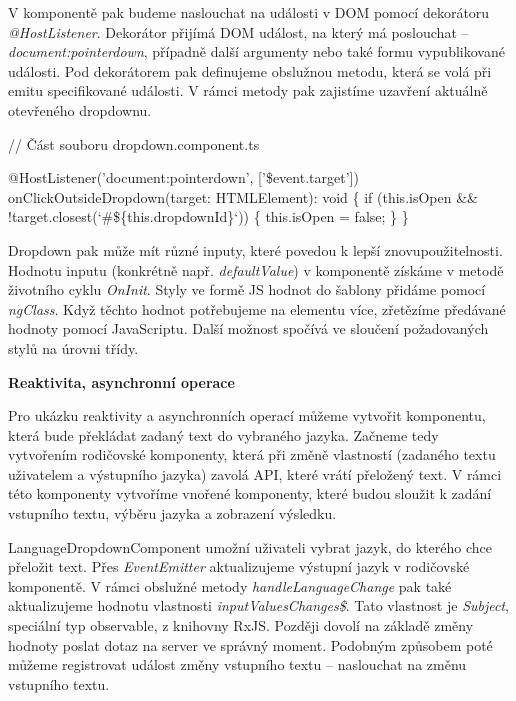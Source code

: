 V komponentě pak budeme naslouchat na události v DOM pomocí dekorátoru \emph{@HostListener}. 
Dekorátor přijímá DOM událost, na který má poslouchat -- \emph{document:pointerdown}, případně další argumenty nebo také formu vypublikované události. 
Pod dekorátorem pak definujeme obslužnou metodu, která se volá při emitu specifikované události. V rámci metody pak zajistíme uzavření aktuálně otevřeného dropdownu.

\begin{prog}
// Část souboru dropdown.component.ts

@HostListener('document:pointerdown', ['\$event.target'])
onClickOutsideDropdown(target: HTMLElement): void \{
  if (this.isOpen && !target.closest(`#\$\{this.dropdownId\}`)) \{
    this.isOpen = false;
  \}
\}
\end{prog}

Dropdown pak může mít různé inputy, které povedou k lepší znovupoužitelnosti. Hodnotu inputu (konkrétně např. \emph{defaultValue}) v komponentě získáme v metodě životního cyklu \emph{OnInit}. 
Styly ve formě JS hodnot do šablony přidáme pomocí \emph{ngClass}. Když těchto hodnot potřebujeme na elementu více, zřetězíme předávané hodnoty pomocí JavaScriptu. 
Další možnost spočívá ve sloučení požadovaných stylů na úrovni třídy.

\begin{flushleft}
  \textbf{Reaktivita, asynchronní operace}
\end{flushleft}

Pro ukázku reaktivity a asynchronních operací můžeme vytvořit komponentu, která bude překládat zadaný text do vybraného jazyka. 
Začneme tedy vytvořením rodičovské komponenty, která při změně vlastností (zadaného textu uživatelem a výstupního jazyka) zavolá API, které vrátí přeložený text. 
V rámci této komponenty vytvoříme vnořené komponenty, které budou sloužit k zadání vstupního textu, výběru jazyka a zobrazení výsledku. 

LanguageDropdownComponent umožní uživateli vybrat jazyk, do kterého chce přeložit text. 
Přes \emph{EventEmitter} aktualizujeme výstupní jazyk v rodičovské komponentě. V rámci obslužné metody \emph{handleLanguageChange} pak také aktualizujeme hodnotu vlastnosti \emph{inputValuesChanges\$}.
Tato vlastnost je \emph{Subject}, speciální typ observable, z knihovny RxJS. Později dovolí na základě změny hodnoty poslat dotaz na server ve správný moment. 
Podobným způsobem poté můžeme registrovat událost změny vstupního textu -- naslouchat na změnu vstupního textu.

